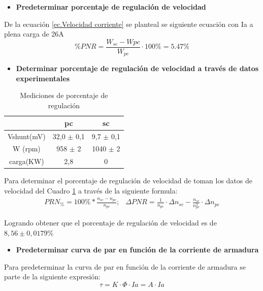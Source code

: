\documentclass[11pt,letterpaper]{article}     %
\begin{document}
	\begin{itemize}
		\item \textbf{Predeterminar porcentaje de regulación de velocidad}
 	\end{itemize}
		De la ecuación \ref{ec.Velocidad corriente} se planteal se siguiente ecuación con Ia a plena carga de 26A
		\begin{equation}
			\% PNR = \frac{W_{sc} - W {pc}}{W_{pc}} \cdot 100 \% = 5.47 \%
		\end{equation}
	\begin{itemize}
		\item \textbf{Determinar porcentaje de regulación de velocidad a través de datos experimentales}
	\end{itemize}
	\begin{table}[H]
		\centering
		\caption{Mediciones de porcentaje de regulación}
		\label{Cuadro:Medicion porcentaje de regulacion}
		\begin{tabular}{|c|c|c|}
			\hline
			& pc & sc\\ \hline
			Vshunt(mV)& 32,0 $\pm$ 0,1 & 9,7 $\pm$ 0,1 \\ \hline
			W (rpm)& 958 $\pm$ 2 &1040 $\pm$ 2 \\ \hline
			carga(KW)  & 2,8 &0\\ \hline
		\end{tabular}
	\end{table}

 Para determinar el porcentaje de regulación de velocidad de toman los datos de velocidad del Cuadro \ref{Cuadro:Medicion porcentaje de regulacion} a través de la siguiente formula:
 \begin{eqnarray}
  PRN_{\%} =100\%*\frac{n_{sc}-n_{pc}}{n_{pc}}; 
  & \Delta PNR = \frac{1 }{n_{pc}}\cdot \Delta n_{sc}-\frac{n_{sc} }{n_{pc}^2}\cdot \Delta n_{pc}
 \end{eqnarray}
 
Logrando obtener que el porcentaje de regulación de velocidad es de $8,56 \pm 0,0179 \%$
\begin{itemize}
	\item \textbf{Predeterminar curva de par en función de la corriente de armadura}
\end{itemize}

	Para predeterminar la curva de par en función de la corriente de armadura se parte de la siguiente expresión:
	\begin{equation}
		\tau = K \cdot \Phi \cdot Ia = A \cdot Ia
		\label{ecuacion par}
	\end{equation}
	
\end{document}
